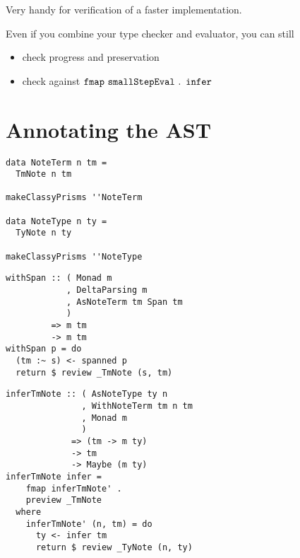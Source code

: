 \documentclass{beamer}
\begin{document}
\begin{frame}[c]
  \begin{center}
    Very handy for verification of a faster implementation.
  \end{center}
\end{frame} 

\begin{frame}[c]
  \begin{center}
Even if you combine your type checker and evaluator, you can still 
\begin{itemize}
\item check progress and preservation
\item check against $\tt{fmap\ smallStepEval\ \ldotp \ infer}$
\end{itemize}
\end{center}
\end{frame}

\section{Annotating the AST}

\begin{frame}[fragile]
  \begin{verbatim}
data NoteTerm n tm =
  TmNote n tm

makeClassyPrisms ''NoteTerm

data NoteType n ty =
  TyNote n ty

makeClassyPrisms ''NoteType
  \end{verbatim}
\end{frame} 

\begin{frame}[fragile]
  \begin{verbatim}
withSpan :: ( Monad m
            , DeltaParsing m
            , AsNoteTerm tm Span tm
            )
         => m tm
         -> m tm
withSpan p = do
  (tm :~ s) <- spanned p
  return $ review _TmNote (s, tm)
  \end{verbatim}
\end{frame} 

\begin{frame}[fragile]
  \begin{verbatim}
inferTmNote :: ( AsNoteType ty n
               , WithNoteTerm tm n tm
               , Monad m
               )
             => (tm -> m ty)
             -> tm
             -> Maybe (m ty)
inferTmNote infer =
    fmap inferTmNote' .
    preview _TmNote
  where
    inferTmNote' (n, tm) = do
      ty <- infer tm
      return $ review _TyNote (n, ty)
  \end{verbatim}
\end{frame} 
\end{document}
